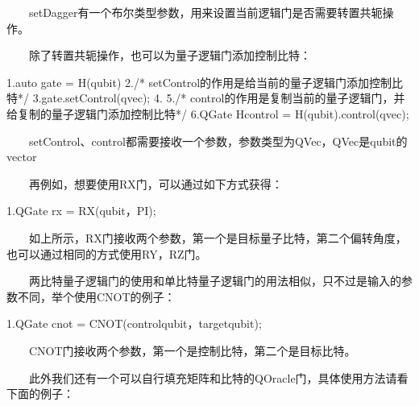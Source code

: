 \documentclass[a4paper,11pt,english]{sphinxmanual}
\begin{document}
\sphinxAtStartPar
  setDagger有一个布尔类型参数，用来设置当前逻辑门是否需要转置共轭操作。

\sphinxAtStartPar
  除了转置共轭操作，也可以为量子逻辑门添加控制比特：

\begin{sphinxVerbatim}[commandchars=\\\{\}]
1.auto gate = H(qubit)
2./* setControl的作用是给当前的量子逻辑门添加控制比特*/
3.gate.setControl(qvec);
4.
5./* control的作用是复制当前的量子逻辑门，并给复制的量子逻辑门添加控制比特*/
6.QGate H\PYGZus{}control = H(qubit).control(qvec);
\end{sphinxVerbatim}

\sphinxAtStartPar
  setControl、control都需要接收一个参数，参数类型为QVec，QVec是qubit的vector

\sphinxAtStartPar
  再例如，想要使用RX门，可以通过如下方式获得：

\begin{sphinxVerbatim}[commandchars=\\\{\}]
1.QGate rx = RX(qubit，PI);
\end{sphinxVerbatim}

\sphinxAtStartPar
  如上所示，RX门接收两个参数，第一个是目标量子比特，第二个偏转角度，也可以通过相同的方式使用RY，RZ门。

\sphinxAtStartPar
  两比特量子逻辑门的使用和单比特量子逻辑门的用法相似，只不过是输入的参数不同，举个使用CNOT的例子：

\begin{sphinxVerbatim}[commandchars=\\\{\}]
1.QGate cnot = CNOT(control\PYGZus{}qubit，target\PYGZus{}qubit);
\end{sphinxVerbatim}

\sphinxAtStartPar
  CNOT门接收两个参数，第一个是控制比特，第二个是目标比特。

\sphinxAtStartPar
  此外我们还有一个可以自行填充矩阵和比特的QOracle门，具体使用方法请看下面的例子：
\end{document}
